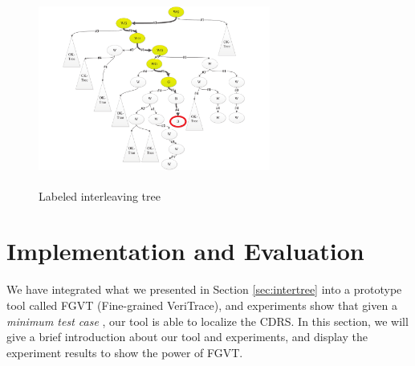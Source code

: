 \documentclass[runningheads]{llncs}
\begin{document}
\begin{figure}
\centering
\vspace{-0.5cm}
\includegraphics[height = 2.5in, width = 3in]{psslabeltree.pdf}
\caption{Labeled interleaving tree}\label{fig:labeledinterleavingtreepss}
\end{figure}









\section{Implementation and Evaluation}\label{sec:implementation}
We have integrated what we presented in Section \ref{sec:intertree} into a prototype tool called FGVT (Fine-grained VeriTrace), and experiments show that given a \textit{minimum test case} \cite{DBLP:conf/seke/ZhangWZ17}, our tool is able to localize the CDRS. In this section, we will give a brief introduction about our tool and experiments, and display the experiment results to show the power of FGVT.
\end{document}
